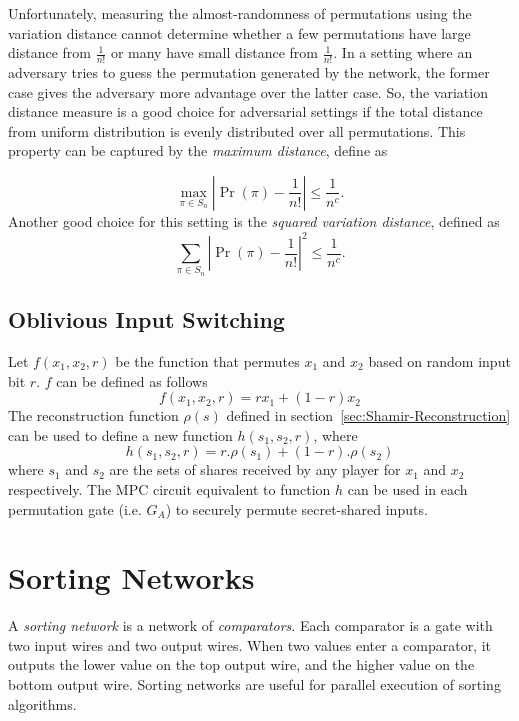 \documentclass[10pt]{article}
\theoremstyle{plain}
\begin{document}
Unfortunately, measuring the almost-randomness of permutations using
the variation distance cannot determine whether a few permutations
have large distance from $\frac{1}{n!}$ or many have small distance
from $\frac{1}{n!}$. In a setting where an adversary tries to guess
the permutation generated by the network, the former case gives the
adversary more advantage over the latter case. So, the variation distance
measure is a good choice for adversarial settings if the total distance
from uniform distribution is evenly distributed over all permutations.
This property can be captured by the \emph{maximum distance}, define
as

\[
\max_{\pi\in S_{n}}|\Pr(\pi)-\frac{1}{n!}|\leq\frac{1}{n^{c}}.
\]
Another good choice for this setting is the \emph{squared variation
	distance}, defined as 
\[
\sum_{\pi\in S_{n}}|\Pr(\pi)-\frac{1}{n!}|^{2}\leq\frac{1}{n^{c}}.
\]


\subsection{Oblivious Input Switching}

Let $f(x_{1},x_{2},r)$ be the function that permutes $x_{1}$ and
$x_{2}$ based on random input bit $r$. $f$ can be defined as follows
\[
f(x_{1},x_{2},r)=rx_{1}+(1-r)x_{2}
\]
The reconstruction function $\rho(s)$ defined in section~\ref{sec:Shamir-Reconstruction}
can be used to define a new function $h(s_{1},s_{2},r)$, where 
\[
h(s_{1},s_{2},r)=r.\rho(s_{1})+(1-r).\rho(s_{2})
\]
where $s_{1}$ and $s_{2}$ are the sets of shares received by any
player for $x_{1}$ and $x_{2}$ respectively. The MPC circuit equivalent
to function $h$ can be used in each permutation gate (i.e. $G_{A}$)
to securely permute secret-shared inputs.

\section{Sorting Networks}

A \emph{sorting network} is a network of \emph{comparators}. Each
comparator is a gate with two input wires and two output wires. When
two values enter a comparator, it outputs the lower value on the top
output wire, and the higher value on the bottom output wire. Sorting
networks are useful for parallel execution of sorting algorithms.
\end{document}
